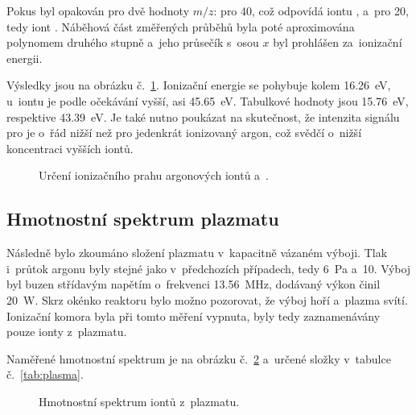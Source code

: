 \documentclass{protokol}
\newcommand\mz{m/z}
\begin{document}
Pokus byl opakován pro dvě hodnoty $\mz$:
pro \SI{40}{\thomson}, což odpovídá iontu ,
a~pro \SI{20}{\thomson}, tedy iont .
Náběhová část změřených průběhů byla poté aproximována polynomem
druhého stupně a~jeho průsečík s~osou $x$ byl prohlášen za~ionizační
energii.

Výsledky jsou na obrázku č.~\ref{fig:ionization}.
Ionizační energie  se pohybuje kolem \SI{16.26}{\electronvolt},
u~iontu  je podle očekávání vyšší, asi \SI{45.65}{\electronvolt}.
Tabulkové hodnoty jsou \SI{15.76}{\electronvolt},
respektive \SI{43.39}{\electronvolt}.
Je také nutno poukázat na skutečnost, že intenzita signálu pro 
je o~řád nižší než pro jedenkrát ionizovaný argon,
což svědčí o~nižší koncentraci vyšších iontů.

\begin{figure}[htp]
	\centering
	
	\caption{Určení ionizačního prahu argonových iontů  a~.}
	\label{fig:ionization}
\end{figure}

\subsection{Hmotnostní spektrum plazmatu}
\label{plasma}
Následně bylo zkoumáno složení plazmatu v~kapacitně vázaném výboji.
Tlak i~průtok argonu byly stejné jako v~předchozích případech,
tedy \SI{6}{\pascal} a~\SI{10}{\sccm}.
Výboj byl buzen střídavým napětím o~frekvenci \SI{13.56}{\mega\hertz},
dodávaný výkon činil \SI{20}{\watt}.
Skrz okénko reaktoru bylo možno pozorovat, že výboj hoří a~plazma svítí.
Ionizační komora byla při tomto měření vypnuta,
byly tedy zaznamenávány pouze ionty z~plazmatu.

Naměřené hmotnostní spektrum je na obrázku č.~\ref{fig:plasma}
a~určené složky v~tabulce č.~\ref{tab:plasma}.

\begin{figure}[htp]
	\centering
	
	\caption{Hmotnostní spektrum iontů z~plazmatu.}
	\label{fig:plasma}
\end{figure}
\end{document}
